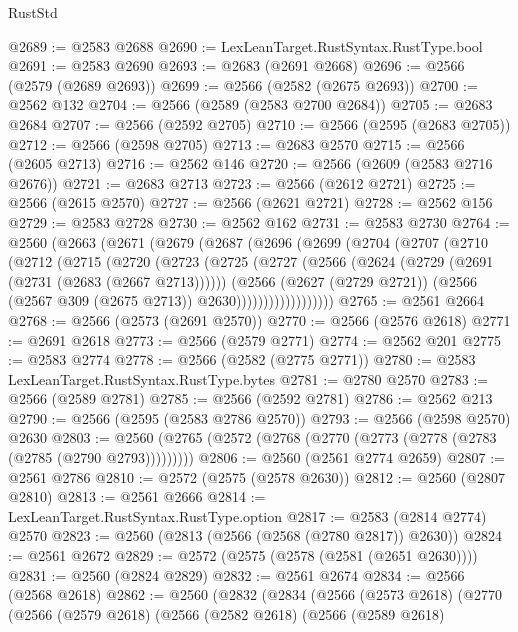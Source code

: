 \begin{lexlean}{RustStd}
\begin{coremodule}
@2689 := @2583 @2688
@2690 := LexLeanTarget.RustSyntax.RustType.bool
@2691 := @2583 @2690
@2693 := @2683 (@2691 @2668)
@2696 := @2566 (@2579 (@2689 @2693))
@2699 := @2566 (@2582 (@2675 @2693))
@2700 := @2562 @132
@2704 := @2566 (@2589 (@2583 @2700 @2684))
@2705 := @2683 @2684
@2707 := @2566 (@2592 @2705)
@2710 := @2566 (@2595 (@2683 @2705))
@2712 := @2566 (@2598 @2705)
@2713 := @2683 @2570
@2715 := @2566 (@2605 @2713)
@2716 := @2562 @146
@2720 := @2566 (@2609 (@2583 @2716 @2676))
@2721 := @2683 @2713
@2723 := @2566 (@2612 @2721)
@2725 := @2566 (@2615 @2570)
@2727 := @2566 (@2621 @2721)
@2728 := @2562 @156
@2729 := @2583 @2728
@2730 := @2562 @162
@2731 := @2583 @2730
@2764 := @2560
    (@2663
      (@2671
        (@2679
          (@2687
            (@2696
              (@2699
                (@2704
                  (@2707
                    (@2710
                      (@2712
                        (@2715
                          (@2720
                            (@2723
                              (@2725
                                (@2727
                                  (@2566
                                    (@2624 (@2729 (@2691 (@2731 (@2683 (@2667 @2713))))))
                                    (@2566
                                      (@2627 (@2729 @2721))
                                      (@2566 (@2567 @309 (@2675 @2713)) @2630))))))))))))))))))
@2765 := @2561 @2664
@2768 := @2566 (@2573 (@2691 @2570))
@2770 := @2566 (@2576 @2618)
@2771 := @2691 @2618
@2773 := @2566 (@2579 @2771)
@2774 := @2562 @201
@2775 := @2583 @2774
@2778 := @2566 (@2582 (@2775 @2771))
@2780 := @2583 LexLeanTarget.RustSyntax.RustType.bytes
@2781 := @2780 @2570
@2783 := @2566 (@2589 @2781)
@2785 := @2566 (@2592 @2781)
@2786 := @2562 @213
@2790 := @2566 (@2595 (@2583 @2786 @2570))
@2793 := @2566 (@2598 @2570) @2630
@2803 := @2560 (@2765 (@2572 (@2768 (@2770 (@2773 (@2778 (@2783 (@2785 (@2790 @2793)))))))))
@2806 := @2560 (@2561 @2774 @2659)
@2807 := @2561 @2786
@2810 := @2572 (@2575 (@2578 @2630))
@2812 := @2560 (@2807 @2810)
@2813 := @2561 @2666
@2814 := LexLeanTarget.RustSyntax.RustType.option
@2817 := @2583 (@2814 @2774) @2570
@2823 := @2560 (@2813 (@2566 (@2568 (@2780 @2817)) @2630))
@2824 := @2561 @2672
@2829 := @2572 (@2575 (@2578 (@2581 (@2651 @2630))))
@2831 := @2560 (@2824 @2829)
@2832 := @2561 @2674
@2834 := @2566 (@2568 @2618)
@2862 := @2560
    (@2832
      (@2834
        (@2566
          (@2573 @2618)
          (@2770
            (@2566
              (@2579 @2618)
              (@2566
                (@2582 @2618)
                (@2566
                  (@2589 @2618)

\end{coremodule}
\end{lexlean}
